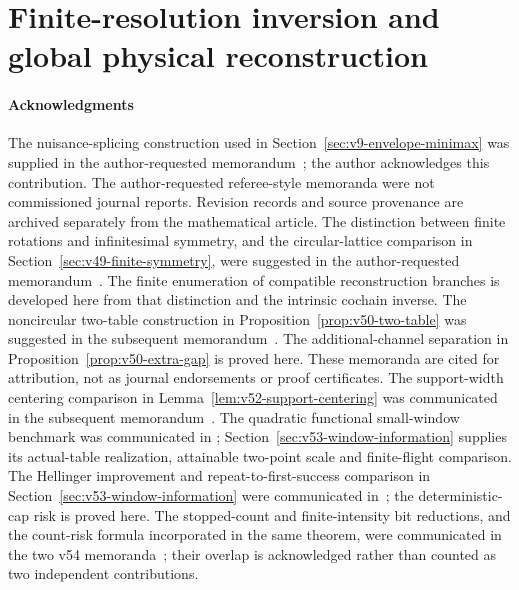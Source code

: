 \part{Finite-resolution inversion and global physical reconstruction}











\subsection*{Acknowledgments}
The nuisance-splicing construction used in
Section~\ref{sec:v9-envelope-minimax} was supplied in the
author-requested memorandum~\cite{A2ReviewV8}; the author acknowledges
this contribution.  The author-requested referee-style memoranda were
not commissioned journal reports.  Revision records and source
provenance are archived separately from the mathematical article.
The distinction between finite rotations and infinitesimal symmetry, and
the circular-lattice comparison in Section~\ref{sec:v49-finite-symmetry},
were suggested in the author-requested memorandum~\cite{A2ReviewV48}.
The finite enumeration of compatible reconstruction branches is developed
here from that distinction and the intrinsic cochain inverse.
The noncircular two-table construction in
Proposition~\ref{prop:v50-two-table} was suggested in the subsequent
memorandum~\cite{A2ReviewV49}.  The additional-channel separation in
Proposition~\ref{prop:v50-extra-gap} is proved here.  These memoranda
are cited for attribution, not as journal endorsements or proof
certificates.
The support-width centering comparison in
Lemma~\ref{lem:v52-support-centering} was communicated in the
subsequent memorandum~\cite{A2ReviewV51}.
The quadratic functional small-window benchmark was communicated in
\cite{A2ReviewV52}; Section~\ref{sec:v53-window-information} supplies
its actual-table realization, attainable two-point scale and finite-flight
comparison.  The Hellinger improvement and repeat-to-first-success
comparison in Section~\ref{sec:v53-window-information} were communicated
in~\cite{A2ReviewV53}; the deterministic-cap risk is proved here.
The stopped-count and finite-intensity bit reductions, and the count-risk
formula incorporated in the same theorem, were communicated in the two
v54 memoranda~\cite{A2ReviewV54First,A2ReviewV54Second}; their overlap
is acknowledged rather than counted as two independent contributions.

